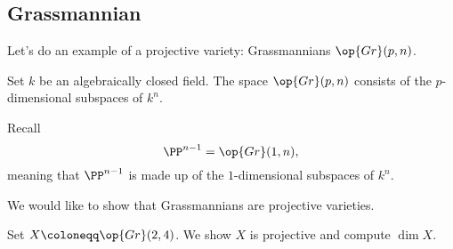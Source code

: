 \subsection{Grassmannian}
Let's do an example of a projective variety: Grassmannians $\op{Gr}(p,n)$. 
\begin{definition}[Grassmannian]
	Set $k$ be an algebraically closed field. The space $\op{Gr}(p,n)$ consists of the $p$-dimensional subspaces of $k^n$.
\end{definition}
\begin{example}
	Recall
	\[\PP^{n-1}=\op{Gr}(1,n),\]
	meaning that $\PP^{n-1}$ is made up of the $1$-dimensional subspaces of $k^n$.
\end{example}
We would like to show that Grassmannians are projective varieties.
\begin{exe}
	Set $X\coloneqq\op{Gr}(2,4)$. We show $X$ is projective and compute $\dim X$.
\end{exe}
